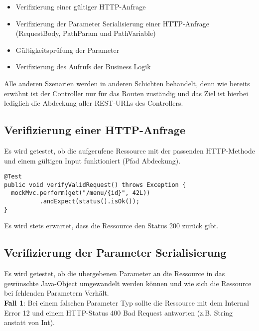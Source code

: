\begin{itemize}
\item Verifizierung einer gültiger HTTP-Anfrage
\item Verifizierung der Parameter Serialisierung einer \ac{HTTP}-Anfrage (RequestBody, PathParam und PathVariable)
\item Gültigkeitsprüfung der Parameter
\item Verifizierung des Aufrufs der Business Logik
\end{itemize}

Alle anderen Szenarien werden in anderen Schichten behandelt, denn wie bereits erwähnt ist der Controller nur für das Routen zuständig und das Ziel ist hierbei lediglich die Abdeckung aller \ac{REST}-\acp{URL} des Controllers.

\subsection*{Verifizierung einer HTTP-Anfrage}

Es wird getestet, ob die aufgerufene Ressource mit der passenden \ac{HTTP}-Methode und einem gültigen Input funktioniert (Pfad Abdeckung).

\newpage
\begin{lstlisting}[caption={Gültige Anfrage Test}, commentstyle=\color{green},]
@Test
public void verifyValidRequest() throws Exception {
  mockMvc.perform(get("/menu/{id}", 42L))
          .andExpect(status().isOk());
}
\end{lstlisting}

Es wird stets erwartet, dass die Ressource den Status 200 zurück gibt.

\subsection*{Verifizierung der Parameter Serialisierung}

Es wird getestet, ob die übergebenen Parameter an die Ressource in das gewünschte Java-Object umgewandelt werden können und wie sich die Ressource bei fehlenden Parametern Verhält.\\
\linebreak
\textbf{Fall 1}: Bei einem falschen Parameter Typ sollte die Ressource mit dem Internal Error 12 und einem \ac{HTTP}-Status 400 Bad Request antworten (z.B. String anstatt von Int). 

